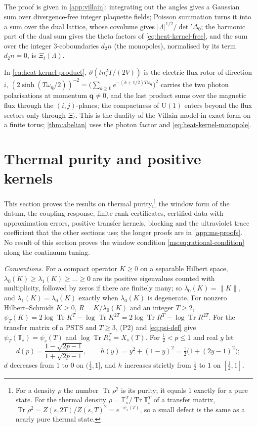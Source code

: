 \documentclass[11pt,a4paper]{amsart}
\theoremstyle{definition}
\theoremstyle{remark}
\numberwithin{equation}{section}
\DeclareMathOperator{\Tr}{Tr}        %
\newcommand{\norm}[1]{\lVert #1\rVert}     %
\newcommand{\abs}[1]{\lvert #1\rvert}      %
\newcommand{\U}{\mathrm{U}}                %
\newcommand{\PSTS}{\textup{PSTS}}          %
\newcommand{\TT}{\mathbb{T}}               %
\newcommand{\Zpart}[2]{Z(#1,#2)}           %
\newcommand{\Zc}{\mathcal{Z}}              %
\newcommand{\XT}[2]{X_{#1}(#2)}            %
\newcommand{\psiT}[2]{\psi_{#1}(#2)}       %
\begin{document}
The proof is given in \cref{app:villain}: integrating out the angles gives a Gaussian sum over divergence-free integer plaquette fields; Poisson summation turns it into a sum over the dual lattice, whose covolume gives $\abs{\Lambda}^{1/2}/\det{}'\Delta_0$; the harmonic part of the dual sum gives the theta factors of \eqref{eq:heat-kernel-free}, and the sum over the integer $3$-coboundaries $d_2n$ (the monopoles), normalised by its term $d_2n=0$, is $\Xi_t(\Lambda)$.

In \eqref{eq:heat-kernel-product}, $\vartheta(tn_i^2T/(2V))$ is the electric-flux rotor of direction $i$, $(2\sinh(T\omega_{\mathbf q}/2))^{-2}=\bigl(\sum_{k\ge0}e^{-(k+1/2)T\omega_{\mathbf q}}\bigr)^2$ carries the two photon polarisations at momentum $\mathbf q\ne0$, and the last product sums over the magnetic flux through the $(i,j)$-planes; the compactness of $\U(1)$ enters beyond the flux sectors only through $\Xi_t$. This is the duality of the Villain model \cite{banks1977,savit1980,frohlich1982} in exact form on a finite torus; \cref{thm:abelian} uses the photon factor and \eqref{eq:heat-kernel-monopole}.
\section{Thermal purity and positive kernels}\label{sec:ms}

This section proves the results on thermal purity,\footnote{For a density $\rho$ the number $\Tr\rho^2$ is its purity; it equals $1$ exactly for a pure state. For the thermal density $\rho=\TT_s^T/\Tr\TT_s^T$ of a transfer matrix, $\Tr\rho^2=\Zpart s{2T}/\Zpart sT^2=e^{-\psiT sT}$, so a small defect is the same as a nearly pure thermal state.} the window form of the datum, the coupling response, finite-rank certificates, certified data with approximation errors, positive transfer kernels, blocking and the ultraviolet trace coefficient that the other sections use; the longer proofs are in \cref{app:ms-proofs}. No result of this section proves the window condition \eqref{ms:eq:rational-condition} along the continuum tuning.

\medskip\noindent\textit{Conventions.} For a compact operator $K\ge0$ on a separable Hilbert space, $\lambda_0(K)\ge\lambda_1(K)\ge\dots\ge0$ are its positive eigenvalues counted with multiplicity, followed by zeros if there are finitely many; so $\lambda_0(K)=\norm K$, and $\lambda_1(K)=\lambda_0(K)$ exactly when $\lambda_0(K)$ is degenerate. For nonzero Hilbert--Schmidt $K\ge0$, $R=K/\lambda_0(K)$ and an integer $T\ge2$, $\psi_T(K)=2\log\Tr K^T-\log\Tr K^{2T}=2\log\Tr R^T-\log\Tr R^{2T}$. For the transfer matrix of a \PSTS{} and $T\ge3$, (P2) and \eqref{eq:psi-def} give $\psi_T(\TT_s)=\psiT{s}{T}$ and $\log\Tr R_s^T=\XT{s}{T}$. For $\frac12<p\le1$ and real $y$ let
\[
d(p)=\frac{1-\sqrt{2p-1}}{1+\sqrt{2p-1}},\qquad h(y)=y^2+(1-y)^2=\tfrac12\bigl(1+(2y-1)^2\bigr);
\]
$d$ decreases from $1$ to $0$ on $(\frac12,1]$, and $h$ increases strictly from $\frac12$ to $1$ on $[\frac12,1]$.
\end{document}
